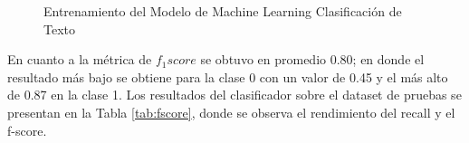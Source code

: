 \documentclass[onecolumn, journal, english, 12pt, a4paper]{IEEEtran} %
\theoremstyle{definition}
\begin{document}
\begin{figure}[!t]
\centering
{}
\hfil
{}
\caption{Entrenamiento del Modelo de Machine Learning Clasificación de Texto}
\label{fig: results}
\end{figure}

En cuanto a la métrica de $f_1score$ se obtuvo en promedio 0.80; en donde el resultado más bajo se obtiene para la clase 0 con un valor de 0.45 y el más alto de 0.87 en la clase 1. Los resultados del clasificador sobre el dataset de pruebas se presentan en la Tabla \ref{tab:fscore}, donde se observa el rendimiento del recall y el f-score.
\end{document}
